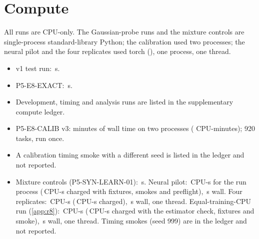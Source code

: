 \documentclass{article}
\theoremstyle{plain}
\theoremstyle{definition}
\theoremstyle{remark}
\begin{document}
\section{Compute}
\label{app:compute}
All runs are CPU-only. The Gaussian-probe runs and the mixture controls are single-process standard-library Python; the calibration used two processes; the neural pilot and the four replicates used torch (\numFmTorch), one process, one thread.
\begin{itemize}
\item v1 test run: \numRuntimeVone\,s.
\item P5-E8-EXACT: \numRuntimeEeight\,s.
\item Development, timing and analysis runs are listed in the supplementary compute ledger.
\item P5-E8-CALIB v3: \numCalibWall{} minutes of wall time on two processes (\numCalibCPU{} CPU-minutes); 920 tasks, run once.
\item A calibration timing smoke with a different seed is listed in the ledger and not reported.
\item Mixture controls (P5-SYN-LEARN-01): \numSynWall\,s. Neural pilot: \numFmCPU\,CPU-s for the run process (\numFmBudgetCPU\,CPU-s charged with fixtures, smokes and preflight), \numFmWall\,s wall. Four replicates: \numRsevenCPU\,CPU-s (\numRsevenBudgetCPU\,CPU-s charged), \numRsevenWall\,s wall, one thread. Equal-training-CPU run (\cref{app:r8}): \numReightCPU\,CPU-s (\numReightBudgetCPU\,CPU-s charged with the estimator check, fixtures and smoke), \numReightWall\,s wall, one thread. Timing smokes (seed 999) are in the ledger and not reported.
\end{itemize}
\end{document}
